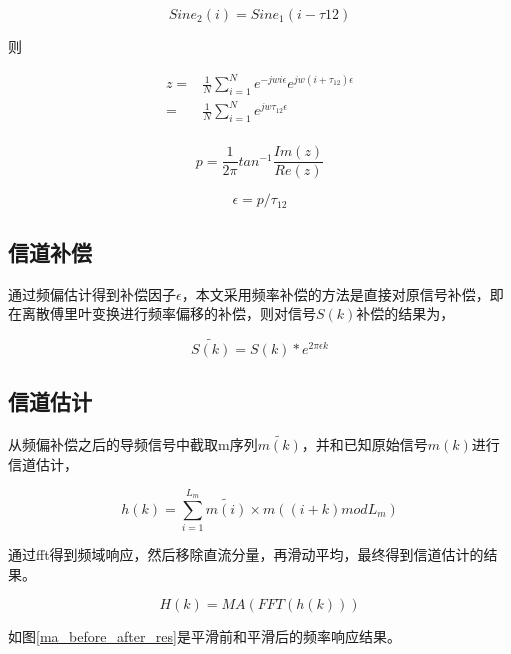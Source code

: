 \documentclass[master]{seuthesis} %
\begin{document}
\begin{Main}
\begin{equation}
    Sine_2(i) = Sine_1(i - \tau{12})
\end{equation}

则

\begin{align}
    z = & \frac{1}{N} \sum_{i=1}^N e^{-jwi\epsilon} e^{jw(i+\tau_{12})\epsilon} \\
      = & \frac{1}{N} \sum_{i=1}^N e^{jw\tau_{12}\epsilon} \\
\end{align}

\begin{equation}
    p = \frac{1}{2\pi} tan^{-1} \frac{Im(z)}{Re(z)} 
\end{equation}

\begin{equation}
    \epsilon = p / \tau_{12}
\end{equation}


\subsection{信道补偿}

通过频偏估计得到补偿因子$\epsilon$，本文采用频率补偿的方法是直接对原信号补偿，即在离散傅里叶变换进行频率偏移的补偿，则对信号$S(k)$补偿的结果为，

\begin{equation}
    \tilde{S(k)} = S(k) * e^{2\pi \epsilon k}
\end{equation}

\subsection{信道估计}

从频偏补偿之后的导频信号中截取m序列$\tilde{m(k)}$，并和已知原始信号$m(k)$进行信道估计，

\begin{equation}
    h(k) = \sum_{i=1}^{L_m} \tilde{m(i)} \times m( (i + k) mod L_m )
\end{equation}

通过fft得到频域响应，然后移除直流分量，再滑动平均，最终得到信道估计的结果。

\begin{equation}
    H(k) = MA(FFT(h(k)))
\end{equation}

如图\ref{ma_before_after_res}是平滑前和平滑后的频率响应结果。


\end{Main}
\end{document}
